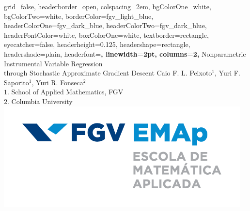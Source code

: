 \documentclass[
    a0paper,
    portrait,
    margin=3cm,
]{baposter}
\theoremstyle{fancy} %
\theoremstyle{regular}
\begin{document}

\begin{poster}
{
    grid=false,
    headerborder=open, %
    colspacing=2em, %
    bgColorOne=white, %
    bgColorTwo=white, %
    borderColor=fgv_light_blue, %
    headerColorOne=fgv_dark_blue, %
    headerColorTwo=fgv_dark_blue, %
    headerFontColor=white, %
    boxColorOne=white, %
    textborder=rectangle, %
    eyecatcher=false, %
    headerheight=0.125\textheight, %
    headershape=rectangle, %
    headershade=plain,
    headerfont=\Large\bf\sffamily\centering, %
    linewidth=2pt, %
    columns=2,
}
{}
%
%
{
{
    \vspace{1.3em}
    {\huge \sffamily Nonparametric Instrumental Variable Regression \\ through Stochastic Approximate  Gradient Descent}
    \vspace{.1em}
}
}
{
        \small{Caio F. L. Peixoto$^1$, Yuri F. Saporito$^1$, Yuri R. Fonseca$^2$}
    {
        \vspace{0.1em} \\
        \small{$1.$ School of Applied Mathematics, FGV}
        \vspace{.1em} \\
        \small{$2.$ Columbia University}
        \vspace{.5em}
    }
}
{
    \includegraphics[width=.27\linewidth]{emap_logo.png}
} %



\end{poster}
\end{document}
